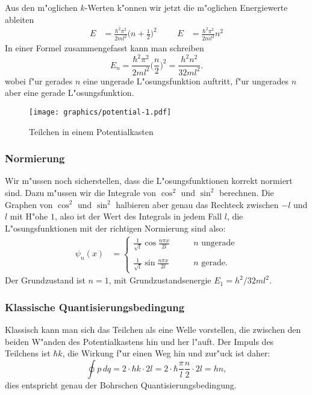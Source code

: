 Aus den m"oglichen $k$-Werten k"onnen wir jetzt die m"oglichen 
Energiewerte ableiten
\begin{align*}
E&=\frac{\hbar^2\pi^2}{2ml^2}\biggl(n+\frac12\biggr)^2
&&&
E&=\frac{\hbar^2\pi^2}{2ml^2}n^2
\end{align*}
In einer Formel zusammengefasst kann man schreiben
\[
E_n
=
\frac{\hbar^2\pi^2}{2ml^2}\biggl(\frac{n}{2}\biggr)^2
=
\frac{h^2n^2}{32ml^2}.
\label{skript:potentialkasten-e}
\]
wobei f"ur gerades $n$ eine ungerade L"osungsfunktion auftritt,
f"ur ungerades $n$ aber eine gerade L"osungsfunktion.
\begin{figure}
\centering
\texttt{[image: graphics/potential-1.pdf]}
\caption{Teilchen in einem Potentialkasten
\label{skript:potentialkasten}}
\end{figure}

\subsubsection{Normierung}
Wir m"ussen noch sicherstellen, dass die L"osungsfunktionen korrekt
normiert sind.
Dazu m"ussen wir die Integrale von $\cos^2$ und $\sin^2$ berechnen.
Die Graphen von $\cos^2$ und $\sin^2$ halbieren aber genau das
Rechteck zwischen $-l$ und $l$ mit H"ohe $1$, also ist der Wert
des Integrals in jedem Fall $l$, die L"osungsfunktionen mit
der richtigen Normierung sind also:
\begin{align}
\psi_n(x)
&=
\begin{cases}
\displaystyle
\frac{1}{\sqrt{l}}\cos\frac{n \pi x}{2l}&\qquad \text{$n$ ungerade}\\
\\
\displaystyle
\frac{1}{\sqrt{l}}\sin\frac{n \pi x}{2l}&\qquad \text{$n$ gerade}.
\end{cases}
\label{skript:potentialkasten-psi-normiert}
\end{align}
Der Grundzustand ist $n=1$, mit Grundzustandsenergie $E_1=h^2/32ml^2$.

\subsubsection{Klassische Quantisierungsbedingung}
Klassisch kann man sich das Teilchen als eine Welle vorstellen, die
zwischen den beiden W"anden des Potentialkastens hin und her l"auft.
Der Impuls des Teilchens ist $\hbar k$, die Wirkung f"ur einen Weg
hin und zur"uck ist daher:
\[
\oint p\,dq
=
2\cdot \hbar k \cdot 2l = 2\cdot \hbar \frac{\pi}{l}\frac{n}{2}\cdot 2l=hn,
\]
dies entspricht genau der Bohrschen Quantisierungsbedingung.


